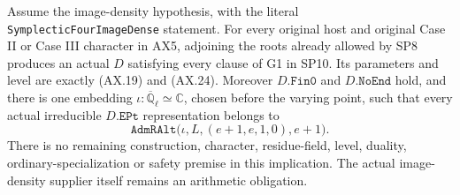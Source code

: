 \begin{proposition}
\label{prop:ax-g1}
Assume the image-density hypothesis, with the literal
\texttt{SymplecticFourImageDense} statement.
For every original host and original Case II or Case III
character in AX5, adjoining the roots already allowed by SP8
produces an actual $D$ satisfying every clause of G1 in SP10.
Its parameters and level are exactly (AX.19) and (AX.24).
Moreover $D.\mathtt{Fin0}$ and $D.\mathtt{NoEnd}$ hold, and there
is one embedding
$\iota:\overline{\mathbb Q}_\ell\simeq\mathbb C$, chosen before
the varying point, such that every actual irreducible
$D.\mathtt{EPt}$ representation belongs to
\[
 \mathtt{AdmRAlt}\bigl(\iota,L,(e+1,e,1,0),e+1\bigr).
 \tag{AX.33}
\]
There is no remaining construction, character, residue-field,
level, duality, ordinary-specialization or safety premise in
this implication.  The actual image-density supplier itself
remains an arithmetic obligation.
\end{proposition}

